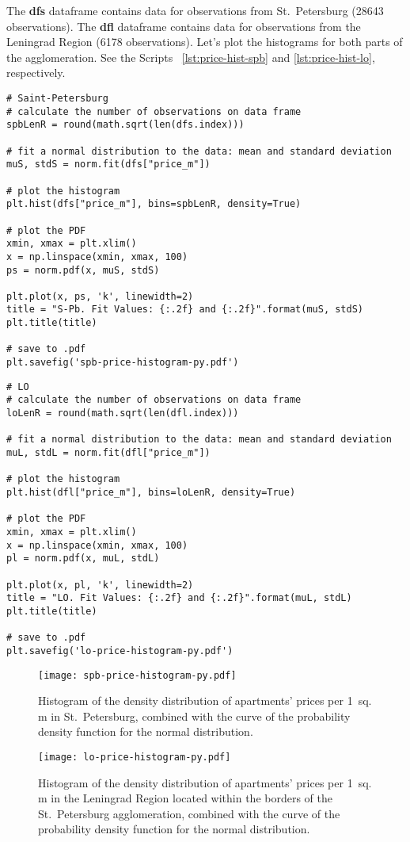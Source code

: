 \documentclass[]{scrreprt}
\begin{document}
%
The \textbf{dfs} dataframe contains data for observations from St.~Petersburg (28643 observations). The \textbf{dfl} dataframe contains data for observations from the Leningrad Region (6178 observations). Let's plot the histograms for both parts of the agglomeration. See the Scripts ~\ref{lst:price-hist-spb} and \ref{lst:price-hist-lo}, respectively.
%
\begin{lstlisting}[float=htp, caption = Histogram plotting for St.~Petersburg., firstnumber=1, label= lst:price-hist-spb]
# Saint-Petersburg
# calculate the number of observations on data frame
spbLenR = round(math.sqrt(len(dfs.index)))

# fit a normal distribution to the data: mean and standard deviation
muS, stdS = norm.fit(dfs["price_m"])

# plot the histogram
plt.hist(dfs["price_m"], bins=spbLenR, density=True)

# plot the PDF
xmin, xmax = plt.xlim()
x = np.linspace(xmin, xmax, 100)
ps = norm.pdf(x, muS, stdS)

plt.plot(x, ps, 'k', linewidth=2)
title = "S-Pb. Fit Values: {:.2f} and {:.2f}".format(muS, stdS)
plt.title(title)

# save to .pdf
plt.savefig('spb-price-histogram-py.pdf')
\end{lstlisting}
%
\begin{lstlisting}[float=htp, caption = Histogram plotting for the Leningrad Region, firstnumber=1, label= lst:price-hist-lo]
# LO
# calculate the number of observations on data frame
loLenR = round(math.sqrt(len(dfl.index)))

# fit a normal distribution to the data: mean and standard deviation
muL, stdL = norm.fit(dfl["price_m"])

# plot the histogram
plt.hist(dfl["price_m"], bins=loLenR, density=True)

# plot the PDF
xmin, xmax = plt.xlim()
x = np.linspace(xmin, xmax, 100)
pl = norm.pdf(x, muL, stdL)

plt.plot(x, pl, 'k', linewidth=2)
title = "LO. Fit Values: {:.2f} and {:.2f}".format(muL, stdL)
plt.title(title)

# save to .pdf
plt.savefig('lo-price-histogram-py.pdf')
\end{lstlisting} 
%
\begin{figure}[htp]
	\centering
	\texttt{[image: spb-price-histogram-py.pdf]}
	\caption{Histogram of the density distribution of apartments' prices per 1~sq.\,m in St.~Petersburg, combined with the curve of the probability density function for the normal distribution.}
	\label{fig:spb-prices-hist}
\end{figure}
%
\begin{figure}[htp]
	\centering
	\texttt{[image: lo-price-histogram-py.pdf]}
	\caption{Histogram of the density distribution of apartments' prices per 1~sq.\,m in the Leningrad Region located within the borders of the St.~Petersburg agglomeration, combined with the curve of the probability density function for the normal distribution.}
	\label{fig:lo-prices-hist}
\end{figure}
%
\end{document}
